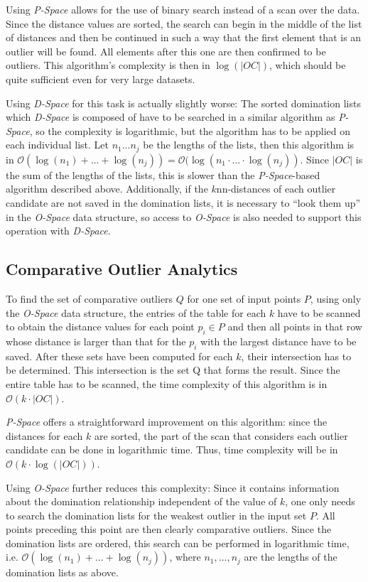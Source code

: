 \documentclass[runningheads]{llncs}
\begin{document}
Using \emph{P-Space} allows for the use of binary search instead of a scan over the data. Since the distance values are sorted, the search can begin in the middle of the list of distances and then be continued in such a way that the first element that is an outlier will be found. All elements after this one are then confirmed to be outliers. This algorithm's complexity is then in $\log(|OC|)$, which should be quite sufficient even for very large datasets.

Using \emph{D-Space} for this task is actually slightly worse: The sorted domination lists which \emph{D-Space} is composed of have to be searched in a similar algorithm as \emph{P-Space}, so the complexity is logarithmic, but the algorithm has to be applied on each individual list. Let $n_1 \ldots n_j$ be the lengths of the lists, then this algorithm is in $\mathcal{O}(\log(n_1) + \ldots + \log(n_j)) = \mathcal{O}(\log(n_1 \cdot \ldots \cdot \log(n_j))$. Since $|OC|$ is the sum of the lengths of the lists, this is slower than the \emph{P-Space}-based algorithm described above. Additionally, if the $k$nn-distances of each outlier candidate are not saved in the domination lists, it is necessary to ``look them up'' in the \emph{O-Space} data structure, so access to \emph{O-Space} is also needed to support this operation with \emph{D-Space}.
\subsection{Comparative Outlier Analytics}

To find the set of comparative outliers $Q$ for one set of input points $P$, using only the \emph{O-Space} data structure, the entries of the table for each $k$ have to be scanned to obtain the distance values for each point $p_i\in P$ and then all points in that row whose distance is larger than that for the $p_i$ with the largest distance have to be saved. After these sets have been computed for each $k$, their intersection has to be determined. This intersection is the set Q that forms the result. Since the entire table has to be scanned, the time complexity of this algorithm is in $\mathcal{O}(k\cdot |OC|)$.

\emph{P-Space} offers a straightforward improvement on this algorithm: since the distances for each $k$ are sorted, the part of the scan that considers each outlier candidate can be done in logarithmic time. Thus, time complexity will be in $\mathcal{O}(k\cdot \log(|OC|))$.

Using \emph{O-Space} further reduces this complexity: Since it contains information about the domination relationship independent of the value of $k$, one only needs to search the domination lists for the weakest outlier in the input set $P$. All points preceding this point are then clearly comparative outliers. Since the domination lists are ordered, this search can be performed in logarithmic time, i.e. $\mathcal{O}(\log(n_1) + \ldots + \log(n_j))$, where $n_1, \ldots , n_j$ are the lengths of the domination lists as above.
\end{document}
